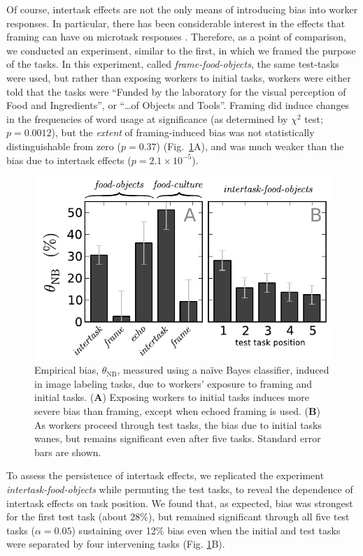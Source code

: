 \documentclass{pnastwo}
\begin{document}
\begin{article}
Of course, intertask effects are not the only means of introducing bias into
worker responses. In particular, there has been considerable interest in the effects that
framing can have on microtask responses
\cite{Kinnaird2012281,chandler2013breaking,thibodeau2013natural}. Therefore, as a point of
comparison, we conducted an experiment, similar to the first, in which we
framed the purpose of the tasks.  In this experiment, called
\textit{frame-food-objects}, the same test-tasks were used, but rather than
exposing workers to initial tasks, workers were either told that the tasks were
``Funded by the laboratory for the visual perception of Food and Ingredients'',
or ``\ldots of Objects and Tools''.  Framing did induce changes in the
frequencies of word usage at significance (as determined by $\chi^2$ test;
$p=0.0012$), but the \textit{extent} of framing-induced bias was not
statistically distinguishable from zero ($p =0.37$) (Fig.~\ref{fig:theta}A),
and was much weaker than the bias due to intertask effects ($p=2.1\times
10^{-5}$).

\begin{figure}
	\centering
	\includegraphics[scale=0.8]{figs/theta.pdf}
	\caption{
		Empirical bias, $\theta_\mathrm{NB}$, measured using a na\"ive Bayes 
		classifier, induced in image labeling tasks, due to workers' 
		exposure to framing and initial tasks.  
		(\textbf{A}) Exposing workers to initial tasks induces more severe
		bias than framing, except when echoed framing is used. 
		(\textbf{B}) As workers proceed through test tasks, 
		the bias due to initial tasks wanes, 
		but remains significant even after five tasks.  
		Standard error bars are shown.
	}
	\label{fig:theta}
\end{figure}

To assess the persistence of intertask effects, we replicated the experiment
\textit{intertask-food-objects} while permuting the test tasks, to reveal the
dependence of intertask effects on task position.  We found that, as expected,
bias was strongest for the first test task (about 28\%), but remained
significant through all five test tasks ($\alpha=0.05$) sustaining over 12\%
bias even when the initial and test tasks were separated by four intervening
tasks (Fig. \ref{fig:theta}B).


\end{article}
\end{document}
